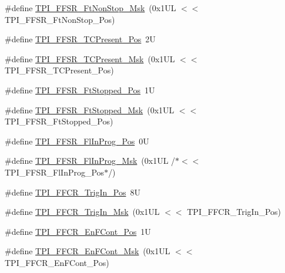\begin{DoxyCompactItemize}
\item 
\#define \mbox{\hyperlink{group___c_m_s_i_s___t_p_i_gaaa313f980974a8cfc7dac68c4d805ab1}{T\+P\+I\+\_\+\+F\+F\+S\+R\+\_\+\+Ft\+Non\+Stop\+\_\+\+Msk}}~(0x1\+U\+L $<$$<$ T\+P\+I\+\_\+\+F\+F\+S\+R\+\_\+\+Ft\+Non\+Stop\+\_\+\+Pos)
\item 
\#define \mbox{\hyperlink{group___c_m_s_i_s___t_p_i_gad30fde0c058da2ffb2b0a213be7a1b5c}{T\+P\+I\+\_\+\+F\+F\+S\+R\+\_\+\+T\+C\+Present\+\_\+\+Pos}}~2U
\item 
\#define \mbox{\hyperlink{group___c_m_s_i_s___t_p_i_ga0d6bfd263ff2fdec72d6ec9415fb1135}{T\+P\+I\+\_\+\+F\+F\+S\+R\+\_\+\+T\+C\+Present\+\_\+\+Msk}}~(0x1\+U\+L $<$$<$ T\+P\+I\+\_\+\+F\+F\+S\+R\+\_\+\+T\+C\+Present\+\_\+\+Pos)
\item 
\#define \mbox{\hyperlink{group___c_m_s_i_s___t_p_i_gaedf31fd453a878021b542b644e2869d2}{T\+P\+I\+\_\+\+F\+F\+S\+R\+\_\+\+Ft\+Stopped\+\_\+\+Pos}}~1U
\item 
\#define \mbox{\hyperlink{group___c_m_s_i_s___t_p_i_ga1ab6c3abe1cf6311ee07e7c479ce5f78}{T\+P\+I\+\_\+\+F\+F\+S\+R\+\_\+\+Ft\+Stopped\+\_\+\+Msk}}~(0x1\+U\+L $<$$<$ T\+P\+I\+\_\+\+F\+F\+S\+R\+\_\+\+Ft\+Stopped\+\_\+\+Pos)
\item 
\#define \mbox{\hyperlink{group___c_m_s_i_s___t_p_i_ga542ca74a081588273e6d5275ba5da6bf}{T\+P\+I\+\_\+\+F\+F\+S\+R\+\_\+\+Fl\+In\+Prog\+\_\+\+Pos}}~0U
\item 
\#define \mbox{\hyperlink{group___c_m_s_i_s___t_p_i_ga63dfb09259893958962914fc3a9e3824}{T\+P\+I\+\_\+\+F\+F\+S\+R\+\_\+\+Fl\+In\+Prog\+\_\+\+Msk}}~(0x1\+U\+L /$\ast$$<$$<$ T\+P\+I\+\_\+\+F\+F\+S\+R\+\_\+\+Fl\+In\+Prog\+\_\+\+Pos$\ast$/)
\item 
\#define \mbox{\hyperlink{group___c_m_s_i_s___t_p_i_gaa7ea11ba6ea75b541cd82e185c725b5b}{T\+P\+I\+\_\+\+F\+F\+C\+R\+\_\+\+Trig\+In\+\_\+\+Pos}}~8U
\item 
\#define \mbox{\hyperlink{group___c_m_s_i_s___t_p_i_ga360b413bc5da61f751546a7133c3e4dd}{T\+P\+I\+\_\+\+F\+F\+C\+R\+\_\+\+Trig\+In\+\_\+\+Msk}}~(0x1\+U\+L $<$$<$ T\+P\+I\+\_\+\+F\+F\+C\+R\+\_\+\+Trig\+In\+\_\+\+Pos)
\item 
\#define \mbox{\hyperlink{group___c_m_s_i_s___t_p_i_ga99e58a0960b275a773b245e2b69b9a64}{T\+P\+I\+\_\+\+F\+F\+C\+R\+\_\+\+En\+F\+Cont\+\_\+\+Pos}}~1U
\item 
\#define \mbox{\hyperlink{group___c_m_s_i_s___t_p_i_ga27d1ecf2e0ff496df03457a2a97cb2c9}{T\+P\+I\+\_\+\+F\+F\+C\+R\+\_\+\+En\+F\+Cont\+\_\+\+Msk}}~(0x1\+U\+L $<$$<$ T\+P\+I\+\_\+\+F\+F\+C\+R\+\_\+\+En\+F\+Cont\+\_\+\+Pos)
$$
\end{DoxyCompactItemize}
